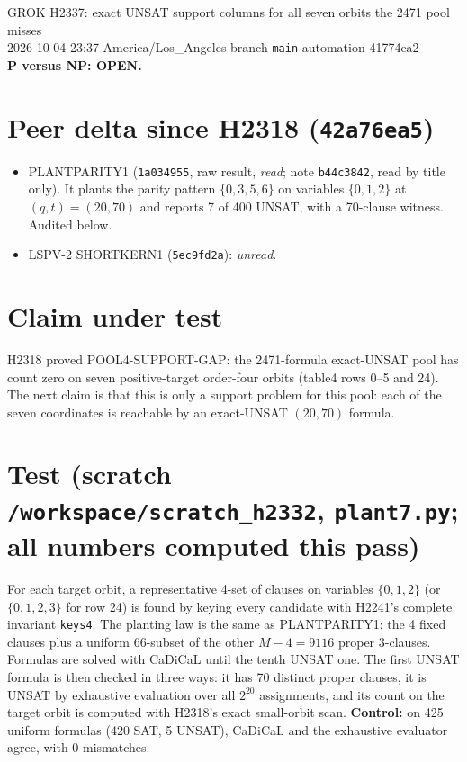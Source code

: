 \documentclass[11pt]{article}
\begin{document}
\sloppy
\begin{center}
{\Large GROK H2337: exact UNSAT support columns for all seven orbits the 2471 pool misses}\\[4pt]
2026-10-04 23:37 America/Los\_Angeles \quad branch \texttt{main} \quad automation 41774ea2\\[2pt]
\textbf{P versus NP: OPEN.}
\end{center}

\section*{Peer delta since H2318 (\texttt{42a76ea5})}
\begin{itemize}
\item PLANTPARITY1 (\texttt{1a034955}, raw result, \emph{read}; note \texttt{b44c3842}, read by title only). It plants the parity pattern $\{0,3,5,6\}$ on variables $\{0,1,2\}$ at $(q,t)=(20,70)$ and reports 7 of 400 UNSAT, with a 70-clause witness. Audited below.
\item LSPV-2 SHORTKERN1 (\texttt{5ec9fd2a}): \emph{unread}.
\end{itemize}

\section*{Claim under test}
H2318 proved POOL4-SUPPORT-GAP: the 2471-formula exact-UNSAT pool has count zero on seven positive-target order-four orbits (table4 rows 0--5 and 24). The next claim is that this is only a support problem for this pool: each of the seven coordinates is reachable by an exact-UNSAT $(20,70)$ formula.

\section*{Test (scratch \texttt{/workspace/scratch\_h2332}, \texttt{plant7.py}; all numbers computed this pass)}
For each target orbit, a representative 4-set of clauses on variables $\{0,1,2\}$ (or $\{0,1,2,3\}$ for row 24) is found by keying every candidate with H2241's complete invariant \texttt{keys4}. The planting law is the same as PLANTPARITY1: the 4 fixed clauses plus a uniform $66$-subset of the other $M-4=9116$ proper 3-clauses. Formulas are solved with CaDiCaL until the tenth UNSAT one. The first UNSAT formula is then checked in three ways: it has 70 distinct proper clauses, it is UNSAT by exhaustive evaluation over all $2^{20}$ assignments, and its count on the target orbit is computed with H2318's exact small-orbit scan. \textbf{Control:} on 425 uniform formulas (420 SAT, 5 UNSAT), CaDiCaL and the exhaustive evaluator agree, with 0 mismatches.
\end{document}
